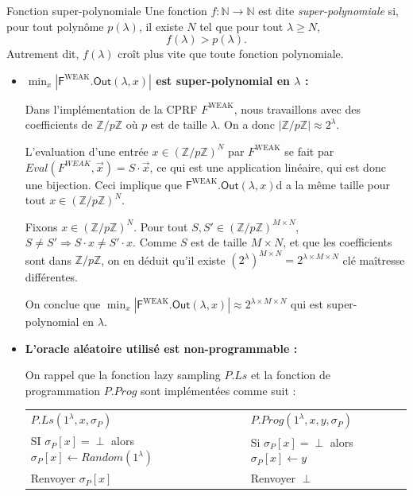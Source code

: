 \documentclass[9pt]{extarticle}
\begin{document}
\begin{defbox}{Fonction super-polynomiale}
Une fonction $f : \mathbb{N} \rightarrow \mathbb{N}$ est dite \emph{super-polynomiale} si, pour tout polynôme $p(\lambda)$, il existe $N$ tel que pour tout $\lambda \geq N$,
\[
f(\lambda) > p(\lambda).
\]
Autrement dit, $f(\lambda)$ croît plus vite que toute fonction polynomiale.
\end{defbox}

\begin{itemize}
\item \textbf{$\min_x |\textsf{F}^{\text{WEAK}}\textsf{.Out}(\lambda, x)|$ est super-polynomial en $\lambda$ :}

Dans l'implémentation de la CPRF $F^{\text{WEAK}}$, nous travaillons avec des coefficients de $\mathbb{Z}/p\mathbb{Z}$ où $p$ est de taille $\lambda$. On a donc $|\mathbb{Z}/p\mathbb{Z}| \approx 2^{\lambda}$.

L'evaluation d'une entrée $x \in (\mathbb{Z}/p\mathbb{Z})^N$ par $F^{\text{WEAK}}$ se fait par $Eval(F^{WEAK},\vec{x}) = S \cdot \vec{x}$, ce qui est une application linéaire, qui est donc une bijection. Ceci implique que $\textsf{F}^{\text{WEAK}}\textsf{.Out}(\lambda, x)$d a la même taille pour tout $x \in (\mathbb{Z}/p\mathbb{Z})^N$.

Fixons $x \in (\mathbb{Z}/p\mathbb{Z})^N$. Pour tout $S,S' \in (\mathbb{Z}/p\mathbb{Z})^{M \times N}$, $S \neq S' \Rightarrow S \cdot x \neq S' \cdot x$. Comme $S$ est de taille $M \times N$, et que les coefficients sont dans $\mathbb{Z}/p\mathbb{Z}$, on en déduit qu'il existe  $(2^{\lambda})^{M \times N} = 2^{\lambda \times M \times N}$ clé maîtresse différentes.

On conclue que $\min_x |\textsf{F}^{\text{WEAK}}\textsf{.Out}(\lambda, x)| \approx 2^{\lambda \times M \times N}$ qui est super-polynomial en $\lambda$.

\item \textbf{L'oracle aléatoire utilisé est non-programmable :}

On rappel que la fonction lazy sampling $P.Ls$ et la fonction de programmation $P.Prog$ sont implémentées comme suit :



\begin{center}
  \begin{tabular}{l|l}
    \textbf{\underline{$P.Ls(1^{\lambda}, x, \sigma_P)$}} & \textbf{\underline{$P.Prog(1^{\lambda}, x, y, \sigma_P)$}} \\
    SI $\sigma_P[x] = \perp$ alors $\sigma_P[x] \leftarrow Random(1^{\lambda})$ & Si $\sigma_P[x] = \perp$ alors $\sigma_P[x] \leftarrow y$ \\
    Renvoyer $\sigma_P[x]$ & Renvoyer $\perp$
  \end{tabular}
\end{center}


\end{itemize}
\end{document}
